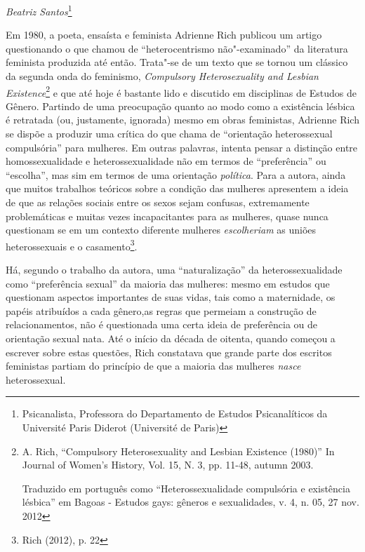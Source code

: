 \begin{flushright}
\emph{Beatriz Santos}\footnote{Psicanalista, Professora do Departamento de Estudos Psicanalíticos da Université Paris Diderot (Université de Paris)}
\end{flushright}


Em 1980, a poeta, ensaísta e feminista Adrienne Rich publicou um artigo
questionando o que chamou de ``heterocentrismo não"-examinado'' da
literatura feminista produzida até então. Trata"-se de um texto que se
tornou um clássico da segunda onda do feminismo, \emph{Compulsory
Heterosexuality and Lesbian Existence}\footnote{A. Rich, ``Compulsory
  Heterosexuality and Lesbian Existence (1980)'' In Journal of Women's
  History, Vol. 15, N. 3, pp. 11-48, autumn 2003.

  Traduzido em português como ``Heterossexualidade compulsória e
  existência lésbica'' em Bagoas - Estudos gays: gêneros e sexualidades,
  v. 4, n. 05, 27 nov. 2012} e que até hoje é bastante lido e discutido
em disciplinas de Estudos de Gênero. Partindo de uma preocupação quanto
ao modo como a existência lésbica é retratada (ou, justamente, ignorada)
mesmo em obras feministas, Adrienne Rich se dispõe a produzir uma
crítica do que chama de ``orientação heterossexual compulsória'' para
mulheres. Em outras palavras, intenta pensar a distinção entre
homossexualidade e heterossexualidade não em termos de ``preferência''
ou ``escolha'', mas sim em termos de uma orientação \emph{política}.
Para a autora, ainda que muitos trabalhos teóricos sobre a condição das
mulheres apresentem a ideia de que as relações sociais entre os sexos
sejam confusas, extremamente problemáticas e muitas vezes incapacitantes
para as mulheres, quase nunca questionam se em um contexto diferente
mulheres \emph{escolheriam} as uniões heterossexuais e o
casamento\footnote{Rich (2012), p. 22}.

Há, segundo o trabalho da autora, uma ``naturalização'' da
heterossexualidade como ``preferência sexual'' da maioria das mulheres:
mesmo em estudos que questionam aspectos importantes de suas vidas, tais
como a maternidade, os papéis atribuídos a cada gênero,as regras que
permeiam a construção de relacionamentos, não é questionada uma certa
ideia de preferência ou de orientação sexual nata. Até o início da
década de oitenta, quando começou a escrever sobre estas questões, Rich
constatava que grande parte dos escritos feministas partiam do princípio
de que a maioria das mulheres \emph{nasce} heterossexual.

